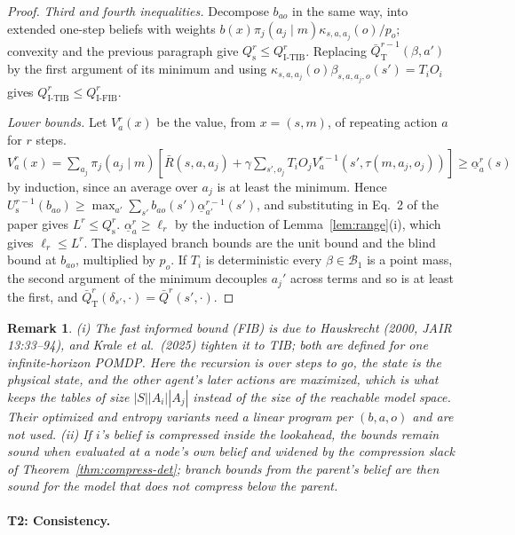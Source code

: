 \documentclass{article}
\newtheorem{remark}{Remark}
\begin{document}
\begin{proof}
\emph{Third and fourth inequalities.} Decompose $b_{ao}$ in the same way, into extended one-step beliefs with
weights $b(x)\pi_j(a_j\mid m)\kappa_{s,a,a_j}(o)/p_o$; convexity and the previous paragraph give
$Q^r_{\mathrm s}\le Q^r_{\mathrm{I\text{-}TIB}}$. Replacing $\bar Q^{r-1}_{\mathrm T}(\beta,a')$ by the first
argument of its minimum and using $\kappa_{s,a,a_j}(o)\beta_{s,a,a_j,o}(s')=T_iO_i$ gives
$Q^r_{\mathrm{I\text{-}TIB}}\le Q^r_{\mathrm{I\text{-}FIB}}$.

\emph{Lower bounds.} Let $V^r_a(x)$ be the value, from $x=(s,m)$, of repeating action $a$ for $r$ steps.
$V^r_a(x)=\sum_{a_j}\pi_j(a_j\mid m)[\bar R(s,a,a_j)+\gamma\sum_{s',o_j}T_iO_jV^{r-1}_a(s',\tau(m,a_j,o_j))]
\ge\underline\alpha^r_a(s)$ by induction, since an average over $a_j$ is at least the minimum. Hence
$U^{r-1}_{\mathrm s}(b_{ao})\ge\max_{a'}\sum_{s'}b_{ao}(s')\underline\alpha^{r-1}_{a'}(s')$, and substituting in
Eq.~2 of the paper gives $L^r\le Q^r_{\mathrm s}$. $\underline\alpha^r_a\ge\ell_r$ by the induction of
Lemma~\ref{lem:range}(i), which gives $\ell_r\le L^r$. The displayed branch bounds are the unit bound and the
blind bound at $b_{ao}$, multiplied by $p_o$. If $T_i$ is deterministic every $\beta\in\mathcal B_1$ is a point
mass, the second argument of the minimum decouples $a_j'$ across terms and so is at least the first, and
$\bar Q^r_{\mathrm T}(\delta_{s'},\cdot)=\bar Q^r(s',\cdot)$.
\end{proof}

\begin{remark}
(i) The fast informed bound (FIB) is due to Hauskrecht (2000, \emph{JAIR} 13:33--94), and Krale et al.\ (2025) tighten it to TIB; both are defined for one infinite-horizon POMDP. Here the recursion is over steps to go, the
state is the physical state, and the other agent's later actions are maximized, which is what keeps the tables
of size $|S||A_i||A_j|$ instead of the size of the reachable model space. Their optimized and entropy variants
need a linear program per $(b,a,o)$ and are not used. (ii) If $i$'s belief is compressed inside the lookahead,
the bounds remain sound when evaluated at a node's own belief and widened by the compression slack of
Theorem~\ref{thm:compress-det}; branch bounds from the parent's belief are then sound for the model that does
not compress below the parent.
\end{remark}

\paragraph{T2: Consistency.}
\end{document}
